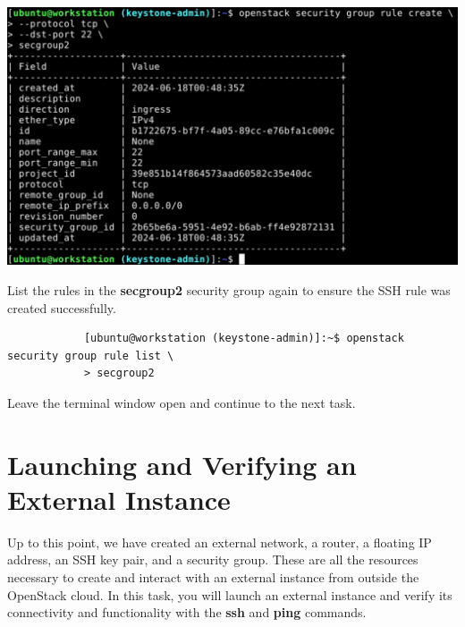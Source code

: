 \documentclass[letterpaper, 12pt]{article}
\begin{document}
\begin{enumerate}
\begin{labstep}
        \begin{center}
            \includegraphics[width=\linewidth]{images/part5/step16.png}
        \end{center}
    \end{labstep}

    \begin{labstep}
        List the rules in the \textbf{secgroup2} security group again to ensure the SSH rule was created successfully.
        \begin{lstlisting}
            [ubuntu@workstation (keystone-admin)]:~$ openstack security group rule list \
            > secgroup2
        \end{lstlisting}
    \end{labstep}

    \begin{labstep}
        Leave the terminal window open and continue to the next task.
    \end{labstep}

\end{enumerate}

\section{Launching and Verifying an External Instance}\label{sec:launching-an-external-instance}
Up to this point, we have created an external network, a router, a floating IP address, an SSH key pair, and a security group.
These are all the resources necessary to create and interact with an external instance from outside the OpenStack cloud.
In this task, you will launch an external instance and verify its connectivity and functionality with the \textbf{ssh} and \textbf{ping} commands.
\end{document}
